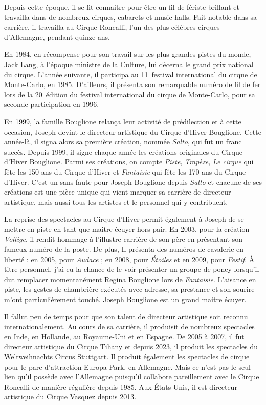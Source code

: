 Depuis cette époque, il se fit connaitre pour être un fil-de-fériste brillant et travailla dans de nombreux cirques, cabarets et music-halls. Fait notable dans sa carrière, il travailla au Cirque Roncalli, l’un des plus célèbres cirques d’Allemagne, pendant quinze ans.

En 1984, en récompense pour son travail sur les plus grandes pistes du monde, Jack Lang, à l’époque ministre de la Culture, lui décerna le grand prix national du cirque. L’année suivante, il participa au 11\ieme~festival international du cirque de Monte-Carlo, en 1985. D’ailleurs, il présenta son remarquable numéro de fil de fer lors de la 20\ieme~édition du festival international du cirque de Monte-Carlo, pour sa seconde participation en 1996.

En 1999, la famille Bouglione relança leur activité de prédilection et à cette occasion, Joseph devint le directeur artistique du Cirque d'Hiver Bouglione. Cette année-là, il signa alors sa première création, nommée \textit{Salto}, qui fut un franc succès. Depuis 1999, il signe chaque année les créations originales du Cirque d’Hiver Bouglione. Parmi ses créations, on compte \textit{Piste}, \textit{Trapèze}, \textit{Le cirque} qui fête les 150 ans du Cirque d'Hiver et \textit{Fantaisie} qui fête les 170 ans du Cirque d’Hiver. C’est un sans-faute pour Joseph Bouglione depuis \textit{Salto} et chacune de ses créations est une pièce unique qui vient marquer sa carrière de directeur artistique, mais aussi tous les artistes et le personnel qui y contribuent.

La reprise des spectacles au Cirque d’Hiver permit également à Joseph de se mettre en piste en tant que maitre écuyer hors pair. En 2003, pour la création \textit{Voltige}, il rendit hommage à l’illustre carrière de son père en présentant son fameux numéro de la poste. De plus, Il présenta des numéros de cavalerie en liberté : en 2005, pour \textit{Audace} ; en 2008, pour \textit{Étoiles} et en 2009, pour \textit{Festif}. À titre personnel, j’ai eu la chance de le voir présenter un groupe de poney lorsqu’il dut remplacer momentanément Regina Bouglione lors de \textit{Fantaisie}. L’aisance en piste, les gestes de chambrière exécutés avec adresse, sa prestance et son sourire m’ont particulièrement touché. Joseph Bouglione est un grand maitre écuyer.

Il fallut peu de temps pour que son talent de directeur artistique soit reconnu internationalement. Au cours de sa carrière, il produisit de nombreux spectacles en Inde, en Hollande, au Royaume-Uni et en Espagne. De 2005 à 2007, il fut directeur artistique du Cirque Tihany et depuis 2023, il produit les spectacles du Weltweihnachts Circus Stuttgart. Il produit également les spectacles de cirque pour le parc d'attraction Europa-Park, en Allemagne. Mais ce n’est pas le seul lien qu’il possède avec l’Allemagne puisqu’il collabore pareillement avec le Cirque Roncalli de manière régulière depuis 1985. Aux États-Unis, il est directeur artistique du Cirque Vasquez depuis 2013.

